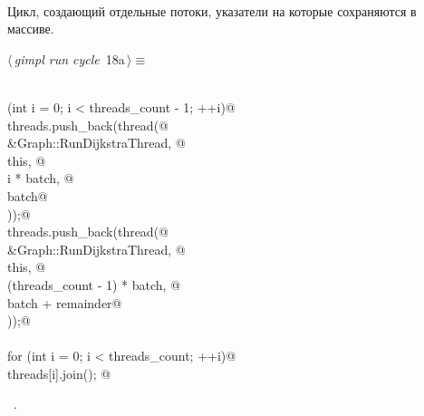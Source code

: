 \documentclass[12pt]{article}
\begin{document}
\paragraph{}
Цикл, создающий отдельные потоки, указатели на которые сохраняются в массиве.
\begin{flushleft} \small
\begin{minipage}{\linewidth}\label{scrap29}\raggedright\small
{} $\langle\,${\itshape gimpl run cycle}\nobreak\ {\footnotesize {18a}}$\,\rangle\equiv$
\vspace{-1ex}
\begin{list}{}{} \item
\mbox{}\verb@@\\
\mbox{}\verb@for (int i = 0; i < threads_count - 1; ++i)@\\
\mbox{}\verb@        threads.push_back(thread(@\\
\mbox{}\verb@          &Graph::RunDijkstraThread, @\\
\mbox{}\verb@          this, @\\
\mbox{}\verb@          i * batch, @\\
\mbox{}\verb@          batch@\\
\mbox{}\verb@        ));@\\
\mbox{}\verb@    threads.push_back(thread(@\\
\mbox{}\verb@        &Graph::RunDijkstraThread, @\\
\mbox{}\verb@        this, @\\
\mbox{}\verb@        (threads_count - 1) * batch, @\\
\mbox{}\verb@        batch + remainder@\\
\mbox{}\verb@      ));@\\
\mbox{}\verb@@\\
\mbox{}\verb@  for (int i = 0; i < threads_count; ++i)@\\
\mbox{}\verb@        threads[i].join(); @\\
\mbox{}\verb@@{\NWsep}
\end{list}
\vspace{-1.5ex}
\footnotesize
\begin{list}{}{\setlength{\itemsep}{-\parsep}\setlength{\itemindent}{-\leftmargin}}
\item \NWtxtMacroRefIn\ .

\item{}
\end{list}
\end{minipage}\vspace{4ex}
\end{flushleft}
\end{document}
